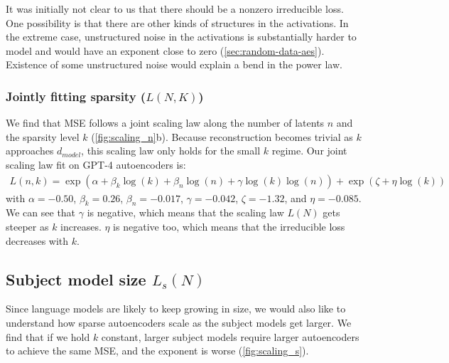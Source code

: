 It was initially not clear to us that there should be a nonzero irreducible loss. 
One possibility is that there are other kinds of structures in the activations.  In the extreme case, unstructured noise in the activations is substantially harder to model and would have an exponent close to zero (\autoref{sec:random-data-aes}). Existence of some unstructured noise would explain a bend in the power law.  %


\subsubsection{Jointly fitting sparsity (\texorpdfstring{$L(N,K)$}{L(N, K)})}
We find that MSE follows a joint scaling law along the number of latents $n$ and the sparsity level $k$ (\autoref{fig:scaling_n}b). Because reconstruction becomes trivial as $k$ approaches $d_{model}$, 
this scaling law only holds for the small $k$ regime.
Our joint scaling law fit on GPT-4 autoencoders is:
\begin{equation}
    \begin{aligned}
        L(n,k) =\exp(\alpha+\beta_k\log(k)+\beta_n\log(n)+\gamma\log(k)\log(n)) + \exp(\zeta+\eta\log(k))
    \end{aligned}
\end{equation}
with $\alpha = -0.50$, $\beta_k = 0.26$, $\beta_n = -0.017$, $\gamma = -0.042$, $\zeta = -1.32$, and $\eta = -0.085$.
We can see that $\gamma$ is negative, 
which means that the scaling law $L(N)$ gets steeper as $k$ increases. $\eta$ is negative too, which means that the irreducible loss decreases with $k$.

















\subsection{Subject model size \texorpdfstring{$L_s(N)$}{L\_s(N)}}


Since language models are likely to keep growing in size, we would also like to understand how sparse autoencoders scale as the subject models get larger.
We find that if we hold $k$ constant, larger subject models require larger autoencoders to achieve the same MSE, and the exponent is worse (\autoref{fig:scaling_s}). 












